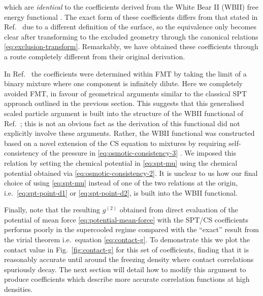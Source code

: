 \documentclass[11pt,twoside]{report}
\begin{document}
which are \emph{identical} to the coefficients derived from the White Bear II (WBII) free energy functional%
.
The exact form of these coefficients differs from that stated in Ref.\ \cite{Hansen-GoosJPCM2006} due to a different definition of the surface, so the equivalence only becomes clear after transforming to the excluded geometry through the canonical relations \eqref{eq:exclusion-transform}.
Remarkably, we have obtained these coefficients through a route completely different from their original derivation.

In Ref.\ \cite{Hansen-GoosJPCM2006} the coefficients were determined within FMT by taking the limit of a binary mixture where one component is infinitely dilute.
Here we completely avoided FMT, in favour of geometrical arguments similar to the classical SPT approach outlined in the previous section.
This suggests that this generalised scaled particle argument is built into the structure of the WBII functional of Ref.\ \cite{Hansen-GoosJPCM2006}; this is not an obvious fact as the derivation of this functional did not explicitly involve these arguments.
Rather, the WBII functional was constructed based on a novel extension of the CS equation to mixtures by requiring self-consistency of the pressure in \eqref{eq:osmotic-consistency-3} \cite{Hansen-GoosJCP2006}.
We imposed this relation by setting the chemical potential in \eqref{eq:spt-mu} using the chemical potential obtained via \eqref{eq:osmotic-consistency-2}.
It is unclear to us how our final choice of using \eqref{eq:spt-mu} instead of one of the two relations at the origin, i.e.\ \eqref{eq:spt-point-d1} or \eqref{eq:spt-point-d2}, is built into the WBII functional.

Finally, note that the resulting $g^{(2)}$ obtained from direct evaluation of the potential of mean force \eqref{eq:potential-mean-force} with the SPT/CS coefficients performs poorly in the supercooled regime compared with the ``exact'' result from the virial theorem i.e.\ equation \eqref{eq:contact-g}.
To demonstrate this we plot the contact value in Fig.\ \ref{fig:contact-g} for this set of coefficients, finding that it is reasonably accurate until around the freezing density where contact correlations spuriously decay.
The next section will detail how to modify this argument to produce coefficients which describe more accurate correlation functions at high densities.
\end{document}
